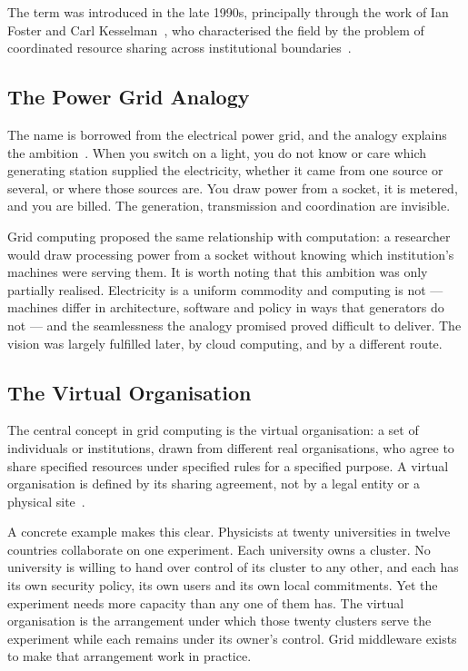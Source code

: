 The term was introduced in the late 1990s, principally through the work of
Ian Foster and Carl Kesselman~, who characterised the field
by the problem of coordinated resource sharing across institutional
boundaries~.

\subsection{The Power Grid Analogy}

The name is borrowed from the electrical power grid, and the analogy explains
the ambition~. When you switch on a light, you do not know or care which
generating station supplied the electricity, whether it came from one source
or several, or where those sources are. You draw power from a socket, it is
metered, and you are billed. The generation, transmission and coordination
are invisible.

Grid computing proposed the same relationship with computation: a researcher
would draw processing power from a socket without knowing which
institution's machines were serving them. It is worth noting that this
ambition was only partially realised. Electricity is a uniform commodity and
computing is not --- machines differ in architecture, software and policy in
ways that generators do not --- and the seamlessness the analogy promised
proved difficult to deliver. The vision was largely fulfilled later, by cloud
computing, and by a different route.

\subsection{The Virtual Organisation}

The central concept in grid computing is the virtual organisation: a set of
individuals or institutions, drawn from different real organisations, who
agree to share specified resources under specified rules for a specified
purpose. A virtual organisation is defined by its sharing agreement, not by a
legal entity or a physical site~.

A concrete example makes this clear. Physicists at twenty universities in
twelve countries collaborate on one experiment. Each university owns a
cluster. No university is willing to hand over control of its cluster to any
other, and each has its own security policy, its own users and its own local
commitments. Yet the experiment needs more capacity than any one of them has.
The virtual organisation is the arrangement under which those twenty clusters
serve the experiment while each remains under its owner's control. Grid
middleware exists to make that arrangement work in practice.

